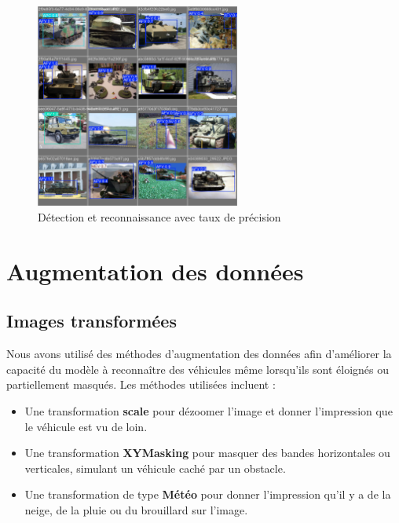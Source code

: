 \begin{figure}[H]
    \center
    \includegraphics[width=0.6\textwidth]{./images/track2_val.jpg}
    \caption[Détection et reconnaissance avec taux de précision]{Détection et reconnaissance avec taux de précision}\label{fig:track2_val}
\end{figure}


\section{Augmentation des données}

\subsection{Images transformées}

Nous avons utilisé des méthodes d'augmentation des données afin d'améliorer la capacité du modèle à reconnaître des véhicules même lorsqu'ils sont éloignés ou partiellement masqués. Les méthodes utilisées incluent :

\begin{itemize}
    \item Une transformation \textbf{scale} pour dézoomer l'image et donner l'impression que le véhicule est vu de loin.
    \item Une transformation \textbf{XYMasking} pour masquer des bandes horizontales ou verticales, simulant un véhicule caché par un obstacle.
    \item Une transformation de type \textbf{Météo} pour donner l'impression qu'il y a de la neige, de la pluie ou du brouillard sur l'image.
\end{itemize}


